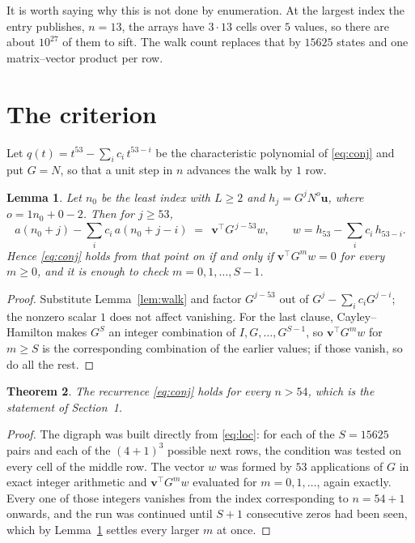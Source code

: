 \documentclass[11pt,a4paper]{article}
\theoremstyle{plain}
\newtheorem{theorem}{Theorem}
\newtheorem{lemma}[theorem]{Lemma}
\theoremstyle{definition}
\begin{document}
It is worth saying why this is not done by enumeration. At the largest index the entry
publishes, $n=13$, the arrays have $3\cdot13$ cells over
$5$ values, so there are about $10^{27}$ of them to sift. The
walk count replaces that by $15625$ states and one matrix--vector product per row.
\section{The criterion}

Let $q(t)=t^{53}-\sum_i c_i\,t^{53-i}$ be the characteristic polynomial of
\eqref{eq:conj} and put $G=N$, so that a unit step in $n$ advances the walk by
$1$ row.

\begin{lemma}\label{lem:crit}
Let $n_0$ be the least index with $L\ge2$ and $h_j=G^{j}N^{o}\mathbf{u}$, where
$o=1n_0+0-2$. Then for $j\ge53$,
\[
a(n_0+j)-\sum_i c_i\,a(n_0+j-i)\;=\;\,\mathbf{v}^{\!\top}G^{\,j-53}w,
\qquad w=h_{53}-\sum_i c_i\,h_{53-i} .
\]
Hence \eqref{eq:conj} holds from that point on if and only if
$\mathbf{v}^{\!\top}G^{m}w=0$ for every $m\ge0$, and it is enough to check
$m=0,1,\dots,S-1$.
\end{lemma}

\begin{proof}
Substitute Lemma~\ref{lem:walk} and factor $G^{j-53}$ out of
$G^{j}-\sum_ic_iG^{j-i}$; the nonzero scalar $1$ does not affect
vanishing. For the last clause, Cayley--Hamilton makes $G^{S}$ an integer combination of
$I,G,\dots,G^{S-1}$, so $\mathbf{v}^{\!\top}G^{m}w$ for $m\ge S$ is the corresponding
combination of the earlier values; if those vanish, so do all the rest.
\end{proof}

\begin{theorem}
The recurrence \eqref{eq:conj} holds for every $n>54$, which is the statement of
Section~1.
\end{theorem}

\begin{proof}
The digraph was built directly from \eqref{eq:loc}: for each of the $S=15625$ pairs and each
of the $(4+1)^{3}$ possible next rows, the condition was tested on every cell of
the middle row. The vector $w$ was formed by $53$ applications of $G$ in exact integer
arithmetic and $\mathbf{v}^{\!\top}G^{m}w$ evaluated for $m=0,1,\dots$, again exactly.
Every one of those integers vanishes from the index corresponding to $n=54+1$ onwards,
and the run was continued until $S+1$ consecutive zeros had been seen, which by
Lemma~\ref{lem:crit} settles every larger $m$ at once.
\end{proof}
\end{document}
